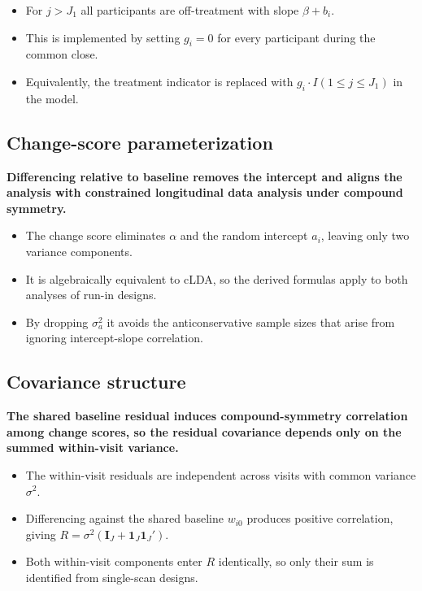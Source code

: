 \documentclass[
  11pt,
]{article}
\begin{document}
\begin{itemize}\setlength{\itemsep}{2pt}\setlength{\parskip}{0pt}
\item For $j > J_1$ all participants are off-treatment with slope $\beta + b_i$.
\item This is implemented by setting $g_i = 0$ for every participant during the common close.
\item Equivalently, the treatment indicator is replaced with $g_i \cdot I(1 \le j \le J_1)$ in the model.
\end{itemize}

\subsection{Change-score parameterization}\label{change-score-parameterization}

\textbf{Differencing relative to baseline removes the intercept and aligns the analysis with constrained longitudinal data analysis under compound symmetry.}

\begin{itemize}\setlength{\itemsep}{2pt}\setlength{\parskip}{0pt}
\item The change score eliminates $\alpha$ and the random intercept $a_i$, leaving only two variance components.
\item It is algebraically equivalent to cLDA, so the derived formulas apply to both analyses of run-in designs.
\item By dropping $\sigma_a^2$ it avoids the anticonservative sample sizes that arise from ignoring intercept-slope correlation.
\end{itemize}

\subsection{Covariance structure}\label{covariance-structure}

\textbf{The shared baseline residual induces compound-symmetry correlation among change scores, so the residual covariance depends only on the summed within-visit variance.}

\begin{itemize}\setlength{\itemsep}{2pt}\setlength{\parskip}{0pt}
\item The within-visit residuals are independent across visits with common variance $\sigma^2$.
\item Differencing against the shared baseline $w_{i0}$ produces positive correlation, giving $R = \sigma^2(\mathbf{I}_J + \mathbf{1}_J \mathbf{1}_J')$.
\item Both within-visit components enter $R$ identically, so only their sum is identified from single-scan designs.
\end{itemize}
\end{document}
